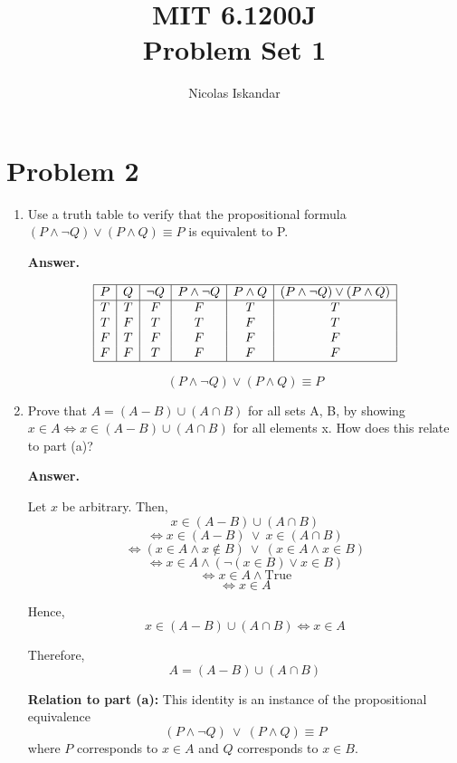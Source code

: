 \documentclass[11pt]{article}
\title{
    \vspace{-2em}
    MIT 6.1200J \\
    Problem Set 1
}
\author{Nicolas Iskandar}
\date{}
\newcommand{\answer}{
    \vspace{0.5em}
    \noindent\textbf{Answer.}
}
\begin{document}
\maketitle

\section*{Problem 2}

\begin{enumerate}[label=\textbf{(\alph*)}]

\item Use a truth table to verify that the propositional formula $(P \land \neg Q)\lor(P \land Q) \equiv P$ is equivalent to P.

\answer

\[
\begin{array}{|c|c|c|c|c|c|}
\hline
P & Q & \neg Q & P \land \neg Q & P \land Q & (P \land \neg Q)\lor(P \land Q) \\
\hline
T & T & F & F & T & T \\
T & F & T & T & F & T \\
F & T & F & F & F & F \\
F & F & T & F & F & F \\
\hline
\end{array}
\]

\[
(P \land \neg Q)\lor(P \land Q) \equiv P
\]

\item Prove that $A = (A - B) \cup (A \cap B)$
for all sets A, B, by showing $x \in A \iff x \in (A - B) \cup (A \cap B)$ for all elements x. How does this relate to part (a)?

\answer

Let \(x\) be arbitrary. Then,
\[
x \in (A - B) \cup (A \cap B)
\]
\[
\iff x \in (A - B) \ \lor\ x \in (A \cap B)
\]
\[
\iff (x \in A \land x \notin B)\ \lor\ (x \in A \land x \in B)
\]
\[
\iff x \in A \land (\neg(x \in B) \lor x \in B)
\]
\[
\iff x \in A \land \text{True}
\]
\[
\iff x \in A
\]

Hence,
\[
x \in (A - B) \cup (A \cap B) \iff x \in A
\]

Therefore,
\[
A = (A - B) \cup (A \cap B)
\]

\textbf{Relation to part (a):} This identity is an instance of the propositional equivalence
\[
(P \land \neg Q)\ \lor\ (P \land Q) \equiv P
\]
where \(P\) corresponds to \(x \in A\) and \(Q\) corresponds to \(x \in B\).

\end{enumerate}
\end{document}
